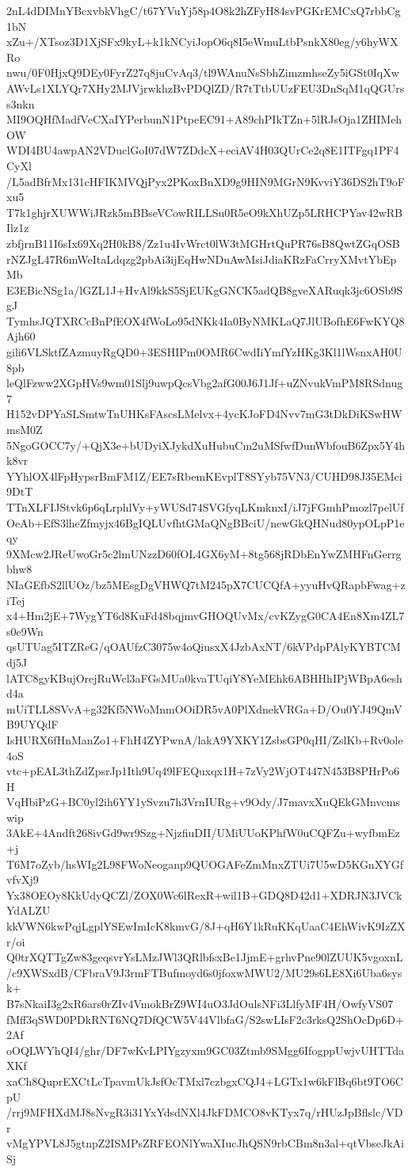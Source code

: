 2nL4dDIMnYBcxvbkVhgC/t67YVuYj58p4O8k2hZFyH84svPGKrEMCxQ7rbbCg1bN
xZu+/XTsoz3D1XjSFx9kyL+k1kNCyiJopO6q8I5eWmuLtbPsnkX80eg/y6hyWXRo
nwu/0F0HjxQ9DEy0FyrZ27q8juCvAq3/tl9WAnuNsSbhZimzmhseZy5iGSt0IqXw
AWvLs1XLYQr7XHy2MJVjrwkhzBvPDQlZD/R7tTtbUUzFEU3DnSqM1qQGUrss3nkn
MI9OQHfMadfVeCXaIYPerbunN1PtpeEC91+A89chPIkTZn+5lRJsOja1ZHIMehOW
WDI4BU4awpAN2VDuclGoI07dW7ZDdcX+eciAV4H03QUrCe2q8E1ITFgq1PF4CyXl
/L5adBfrMx131cHFIKMVQjPyx2PKoxBnXD9g9HIN9MGrN9KvviY36DS2hT9oFxu5
T7k1ghjrXUWWiJRzk5mBBseVCowRILLSu0R5eO9kXhUZp5LRHCPYav42wRBIlz1z
zbfjrnB11I6sIx69Xq2H0kB8/Zz1u4IvWrct0lW3tMGHrtQuPR76sB8QwtZGqOSB
rNZJgL47R6mWeItaLdqzg2pbAi3ijEqHwNDuAwMsiJdiaKRzFaCrryXMvtYbEpMb
E3EBicNSg1a/lGZL1J+HvAl9kkS5SjEUKgGNCK5adQB8gveXARuqk3jc6OSb9SgJ
TymhsJQTXRCcBnPfEOX4fWoLo95dNKk4Ia0ByNMKLaQ7JlUBofhE6FwKYQ8Ajh60
gili6VLSktfZAzmuyRgQD0+3ESHIPm0OMR6CwdIiYmfYzHKg3Kl1lWsnxAH0U8pb
leQlFzww2XGpHVs9wm01Slj9uwpQcsVbg2afG00J6J1Jf+uZNvukVmPM8RSdnug7
H152vDPYaSLSmtwTnUHKsFAscsLMelvx+4ycKJoFD4Nvv7mG3tDkDiKSwHWmsM0Z
5NgoGOCC7y/+QjX3e+bUDyiXJykdXuHubuCm2uMSfwfDunWbfouB6Zpx5Y4hk8vr
YYhlOX4lFpHypsrBmFM1Z/EE7sRbemKEvplT8SYyb75VN3/CUHD98J35EMci9DtT
TTnXLFIJStvk6p6qLrphlVy+yWUSd74SVGfyqLKmknxI/iJ7jFGmhPmozl7pelUf
OeAb+EfS3lheZfmyjx46BgIQLUvfhtGMaQNgBBciU/newGkQHNud80ypOLpP1eqy
9XMcw2JReUwoGr5c2lmUNzzD60fOL4GX6yM+8tg568jRDbEnYwZMHFnGerrgbhw8
NIaGEfbS2llUOz/bz5MEsgDgVHWQ7tM245pX7CUCQfA+yyuHvQRapbFwag+ziTej
x4+Hm2jE+7WygYT6d8KuFd48bqjmvGHOQUvMx/cvKZygG0CA4En8Xm4ZL7s0e9Wn
qsUTUag5ITZReG/qOAUfzC3075w4oQiusxX4JzbAxNT/6kVPdpPAlyKYBTCMdj5J
lATC8gyKBujOrejRuWcl3aFGsMUa0kvaTUqiY8YeMEhk6ABHHhIPjWBpA6eshd4a
mUiTLL8SVvA+g32Kf5NWoMnmOOiDR5vA0PlXdnekVRGa+D/Ou0YJ49QmVB9UYQdF
IsHURX6fHnManZo1+FhH4ZYPwnA/lakA9YXKY1ZsbsGP0qHI/ZslKb+Rv0ole4oS
vtc+pEAL3thZdZpsrJp1Ith9Uq49lFEQuxqx1H+7zVy2WjOT447N453B8PHrPo6H
VqHbiPzG+BC0yl2ih6YY1ySvzu7h3VrnIURg+v9Ody/J7mavxXuQEkGMnvcmswip
3AkE+4Andft268ivGd9wr9Szg+NjzfiuDII/UMiUUoKPhfW0uCQFZu+wyfbmEz+j
T6M7oZyb/hsWIg2L98FWoNeoganp9QUOGAFeZmMnxZTUi7U5wD5KGnXYGfvfvXj9
Yx38OEOy8KkUdyQCZl/ZOX0Wc6lRexR+wil1B+GDQ8D42d1+XDRJN3JVCkYdALZU
kkVWN6kwPqjLgplYSEwImIcK8kmvG/8J+qH6Y1kRuKKqUaaC4EhWivK9IzZXr/oi
Q0trXQTTgZw83geqsvrYsLMzJWl3QRlbfsxBe1JjmE+grhvPne90lZUUK5vgoxnL
/c9XWSxdB/CFbraV9J3rmFTBufmoyd6s0jfoxwMWU2/MU29s6LE8Xi6Uba6sysk+
B7sNkaiI3g2xR6ars0rZIv4VmokBrZ9WI4uO3JdOulsNFi3LlfyMF4H/OwfyVS07
fMff3qSWD0PDkRNT6NQ7DfQCW5V44VlbfaG/S2swLIsF2c3rksQ2ShOcDp6D+2Af
oOQLWYhQI4/ghr/DF7wKvLPIYgzyxm9GC03Ztmb9SMgg6IfogppUwjvUHTTdaXKf
xaCh8QuprEXCtLcTpavmUkJsfOcTMxl7czbgxCQJ4+LGTx1w6kFlBq6bt9TO6CpU
/rrj9MFHXdMJ8sNvgR3i31YxYdsdNXl4JkFDMCO8vKTyx7q/rHUzJpBflslc/VDr
vMgYPVL8J5gtnpZ2ISMPsZRFEONlYwaXIucJhQSN9rbCBm8n3al+qtVbseJkAiSj
